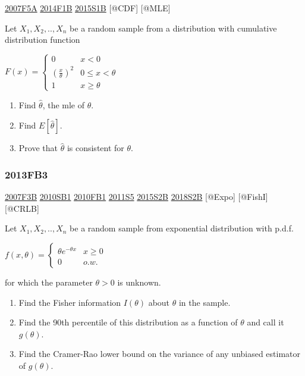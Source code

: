 \documentclass[6pt,Portrait]{article}
\begin{document}
\protect\hyperlink{f5a}{2007F5A} \protect\hyperlink{f1b-1}{2014F1B}
\protect\hyperlink{s1b-1}{2015S1B} {[}@CDF{]} {[}@MLE{]}

Let \(X_1,X_2,..,X_n\) be a random sample from a distribution with
cumulative distribution function

\(F(x)=\begin{cases}0&x<0\\(\frac{x}\theta)^2& 0\le x<\theta\\1& x\ge\theta\end{cases}\)

\begin{enumerate}
\def\labelenumi{(\alph{enumi})}
\item
  Find \(\hat\theta\), the mle of \(\theta\).
\item
  Find \(E[\hat\theta]\).
\item
  Prove that \(\hat\theta\) is consistent for \(\theta\).
\end{enumerate}

\hypertarget{fb3-2}{%
\subsubsection{2013FB3}\label{fb3-2}}

\protect\hyperlink{f3b}{2007F3B} \protect\hyperlink{sb1-1}{2010SB1}
\protect\hyperlink{fb1-1}{2010FB1} \protect\hyperlink{s5-2}{2011S5}
\protect\hyperlink{s2b-1}{2015S2B} \protect\hyperlink{s2b-2}{2018S2B}
{[}@Expo{]} {[}@FishI{]} {[}@CRLB{]}

Let \(X_1,X_2,..,X_n\) be a random sample from exponential distribution
with p.d.f.

\(f(x,\theta)=\begin{cases}\theta e^{-\theta x}& x\ge0\\0& o.w.\end{cases}\)

for which the parameter \(\theta>0\) is unknown.

\begin{enumerate}
\def\labelenumi{(\alph{enumi})}
\item
  Find the Fisher information \(I(\theta)\) about \(\theta\) in the
  sample.
\item
  Find the 90th percentile of this distribution as a function of
  \(\theta\) and call it \(g(\theta)\).
\item
  Find the Cramer-Rao lower bound on the variance of any unbiased
  estimator of \(g(\theta)\).
\end{enumerate}
\end{document}
